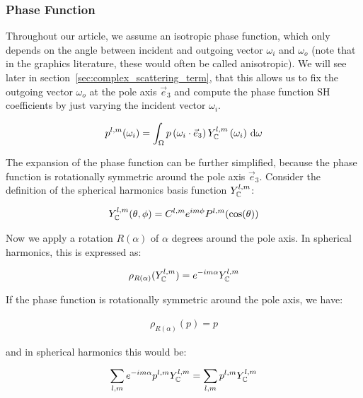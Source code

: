 \documentclass[10pt]{scrartcl}
\begin{document}
\subsubsection{Phase Function}
\label{sec:complex_proj_phase}

Throughout our article, we assume an isotropic phase function, which only depends on the angle between incident and outgoing vector $\omega_i$ and $\omega_o$ (note that in the graphics literature, these would often be called anisotropic). We will see later in section~\ref{sec:complex_scattering_term}, that this allows us to fix the outgoing vector $\omega_o$ at the pole axis $\vec{e}_3$ and compute the phase function SH coefficients by just varying the incident vector $\omega_i$.

\begin{align*}
p^{l,m}(\omega_i)
=
\int_\Omega
{
p\left(\omega_i\cdot\vec{e}_3\right)
Y_{\mathbb{C}}^{l,m}\left(\omega_i\right)
\,\mathrm{d}\omega
}
\nonumber
\end{align*}

The expansion of the phase function can be further simplified, because the phase function is rotationally symmetric around the pole axis $\vec{e}_3$. Consider the definition of the spherical harmonics basis function $Y_{\mathbb{C}}^{l,m}$:

\begin{align*}
Y_{\mathbb{C}}^{l,m}(\theta, \phi) = C^{l,m}e^{im\phi}P^{l,m}(\operatorname{cos}(\theta))
\end{align*}

Now we apply a rotation $R(\alpha)$ of $\alpha$ degrees around the pole axis. In spherical harmonics, this is expressed as:

\begin{align*}
\rho_{R(\alpha)}(Y_{\mathbb{C}}^{l,m}) = e^{-i m\alpha}Y_{\mathbb{C}}^{l,m}
\end{align*}

If the phase function is rotationally symmetric around the pole axis, we have:

\begin{align*}
\rho_{R(\alpha)}(p) = p
\end{align*}

and in spherical harmonics this would be:

\begin{align*}
\sum_{l,m}
{
e^{-i m\alpha}
p^{l,m}
Y_{\mathbb{C}}^{l,m} }
=
\sum_{l,m}
{
p^{l,m}
Y_{\mathbb{C}}^{l,m}
}
\end{align*}
\end{document}
